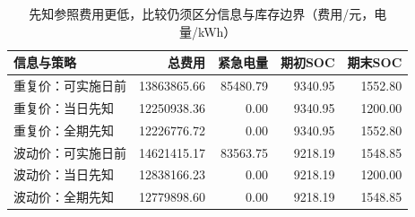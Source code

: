 \begin{table}[H]\centering\small
\caption{先知参照费用更低，比较仍须区分信息与库存边界（费用/元，电量/kWh）}\label{tab:information_benchmark}
\begin{tabular}{lrrrr}\toprule
信息与策略 & 总费用 & 紧急电量 & 期初SOC & 期末SOC \\\midrule
重复价：可实施日前 & 13863865.66 & 85480.79 & 9340.95 & 1552.80 \\
重复价：当日先知 & 12250938.36 & 0.00 & 9340.95 & 1200.00 \\
重复价：全期先知 & 12226776.72 & 0.00 & 9340.95 & 1552.80 \\
波动价：可实施日前 & 14621415.17 & 83563.75 & 9218.19 & 1548.85 \\
波动价：当日先知 & 12838166.23 & 0.00 & 9218.19 & 1200.00 \\
波动价：全期先知 & 12779898.60 & 0.00 & 9218.19 & 1548.85 \\
\bottomrule\end{tabular}\end{table}
